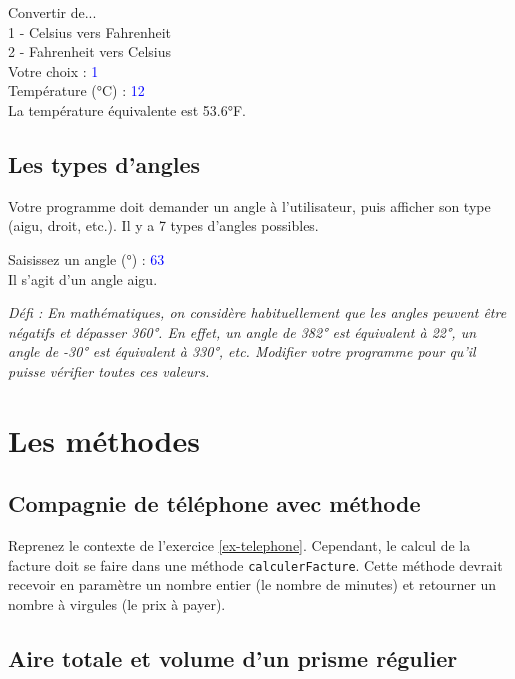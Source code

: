 \documentclass[12pt]{article}
\newenvironment{console}
	{
	\tcolorbox[title={Sortie console}, sharp corners = south, boxsep = 1.5mm]{} \tt
	}{\endtcolorbox}
\begin{document}
\begin{console}
Convertir de...\\
1 - Celsius vers Fahrenheit\\
2 - Fahrenheit vers Celsius\\[\baselineskip]
Votre choix : \textcolor{blue}{1}\\[\baselineskip]
Température (°C) : \textcolor{blue}{12}\\
La température équivalente est 53.6°F.
\end{console}

\subsection{Les types d'angles}

Votre programme doit demander un angle à l'utilisateur, puis afficher son type (aigu, droit, etc.). Il y a 7 types d'angles possibles. 

\begin{console}
Saisissez un angle (°) : \textcolor{blue}{63}\\
Il s'agit d'un angle aigu.
\end{console}

\textit{Défi : En mathématiques, on considère habituellement que les angles peuvent être négatifs et dépasser 360°. En effet, un angle de 382° est équivalent à 22°, un angle de -30° est équivalent à 330°, etc. Modifier votre programme pour qu'il puisse vérifier toutes ces valeurs.}
%
%

\section{Les méthodes}

\subsection{Compagnie de téléphone avec méthode}

Reprenez le contexte de l'exercice \ref{ex-telephone}. Cependant, le calcul de la facture doit se faire dans une méthode \texttt{calculerFacture}. Cette méthode devrait recevoir en paramètre un nombre entier (le nombre de minutes) et retourner un nombre à virgules (le prix à payer).

\subsection{Aire totale et volume d'un prisme régulier}
\end{document}
